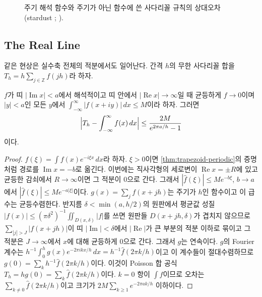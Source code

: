 \begin{figure}[htbp]
\centering
{}
\caption{주기 해석 함수와 주기가 아닌 함수에 쓴 사다리꼴 규칙의 상대오차(stardust ; ).}
\label{fig:trap-periodic}
\end{figure}

\subsection{The Real Line}

같은 현상은 실수축 전체의 적분에서도 일어난다. 간격 $h$의 무한 사다리꼴 합을 $T_h=h\sum_{j\in\mathbb{Z}}f(jh)$라 하자.

\begin{theorem}
\label{thm:trapezoid-line}
$f$가 띠 $|\operatorname{Im}x|<a$에서 해석적이고 띠 안에서 $|\operatorname{Re}x|\to\infty$일 때 균등하게 $f\to0$이며 $|y|<a$인 모든 $y$에서 $\int_{-\infty}^\infty|f(x+iy)|\,dx\le M$이라 하자. 그러면
\[
\Bigl|T_h-\int_{-\infty}^\infty f(x)\,dx\Bigr|\le\frac{2M}{e^{2\pi a/h}-1}
\]
이다.
\end{theorem}

\begin{proof}
$\hat f(\xi)=\int f(x)e^{-i\xi x}\,dx$라 하자. $\xi>0$이면 \cref{thm:trapezoid-periodic}의 증명처럼 경로를 $\operatorname{Im}x=-b$로 옮긴다. 이번에는 직사각형의 세로변이 $\operatorname{Re}x=\pm R$에 있고 균등한 감쇠에서 $R\to\infty$이면 그 적분이 $0$으로 간다. 그래서 $|\hat f(\xi)|\le Me^{-b\xi}$, $b\to a$에서 $|\hat f(\xi)|\le Me^{-a|\xi|}$이다. $g(x)=\sum_jf(x+jh)$는 주기가 $h$인 함수이고 이 급수는 균등수렴한다. 반지름 $\delta<\min(a,h/2)$의 원판에서 평균값 성질 $|f(x)|\le(\pi\delta^2)^{-1}\iint_{D(x,\delta)}|f|$를 쓰면 원판들 $D(x+jh,\delta)$가 겹치지 않으므로 $\sum_{|j|>J}|f(x+jh)|$이 띠 $|\operatorname{Im}|<\delta$에서 $|\operatorname{Re}|$가 큰 부분의 적분 이하로 묶이고 그 적분은 $J\to\infty$에서 $x$에 대해 균등하게 $0$으로 간다. 그래서 $g$는 연속이다. $g$의 Fourier 계수는 $h^{-1}\int_0^hg(x)e^{-2\pi ikx/h}\,dx=h^{-1}\hat f(2\pi k/h)$이고 이 계수들이 절대수렴하므로 $g(0)=\sum_kh^{-1}\hat f(2\pi k/h)$이다. 이것이 Poisson 합 공식 $T_h=hg(0)=\sum_k\hat f(2\pi k/h)$이다. $k=0$ 항이 $\int f$이므로 오차는 $\sum_{k\ne0}\hat f(2\pi k/h)$이고 크기가 $2M\sum_{k\ge1}e^{-2\pi ak/h}$ 이하이다.
\end{proof}

